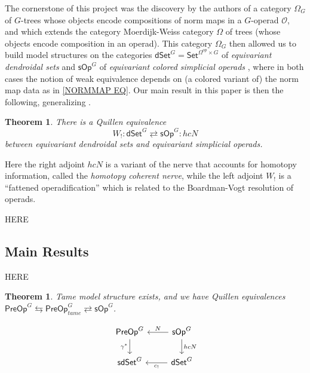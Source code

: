 \documentclass[a4paper,10pt
,draft
]{article}%
\numberwithin{equation}{section}
\numberwithin{figure}{section}
\newtheorem{theorem}[equation]{Theorem}%
\theoremstyle{definition} %
\newcommand{\sOp}{\ensuremath{\mathsf{sOp}}}%
\newcommand{\dSet}{\mathsf{dSet}}
\renewcommand{\O}{\ensuremath{\mathcal O}}
\newcommand{\1}{\ensuremath{\mathbbm 1}}%
\begin{document}
The cornerstone of this project was the discovery by the authors of 
a category $\Omega_G$ of $G$-trees 
whose objects encode compositions of norm maps
in a $G$-operad $\O$,
and which extends the category Moerdijk-Weiss category $\Omega$
of trees (whose objects encode composition in an operad).
This category $\Omega_G$
then allowed us to build model structures
on the categories
$\mathsf{dSet}^G = \mathsf{Set}^{\Omega^{op} \times G}$
of \emph{equivariant dendroidal sets}
\cite{Per18}
and 
$\mathsf{sOp}^G$
of 
\emph{equivariant colored simplicial operads}
\cite{BP_HGOP},
where in both cases the notion of weak equivalence
depends on (a colored variant of) the norm map data as in 
\eqref{NORMMAP EQ}.
Our main result in this paper is then the following,
generalizing \cite[Thm. 8.15]{CM13b}.
\begin{theorem}\label{QE THM}
	There is a Quillen equivalence
	\begin{equation}
	\label{QE_EQ}
	W_! \colon \dSet^G \rightleftarrows \sOp^G \colon hcN
	\end{equation}
	between equivariant dendroidal sets and
	equivariant simplicial operads.
\end{theorem}
Here the right adjoint $hcN$
is a variant of the nerve that accounts for homotopy information,
called the \emph{homotopy coherent nerve},
while the left adjoint $W_!$
is a ``fattened operadification'' 
which is related to the Boardman-Vogt resolution of operads.




{\color{red} HERE}






\subsection{Main Results}







{\color{blue} HERE}



\begin{theorem}
	Tame model structure exists, and we have Quillen equivalences
	$\mathsf{PreOp}^G \leftrightarrows \mathsf{PreOp}^G_{tame} \rightleftarrows \sOp^G$.
\end{theorem}




\[
      \begin{tikzcd}
            \mathsf{PreOp}^G \ar{d}[swap]{\gamma^{\**}}&
            \mathsf{sOp}^G \ar{l}[swap]{N} \ar{d}{hcN}
            \\
            \mathsf{sdSet}^G &
            \mathsf{dSet}^G \ar{l}{c_{!}}
      \end{tikzcd}
\]
\end{document}

